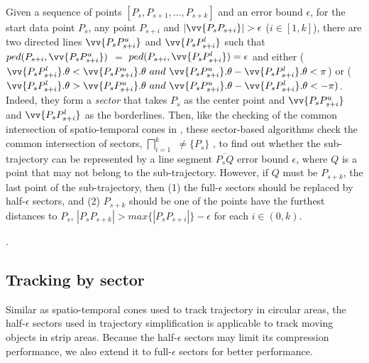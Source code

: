 Given a sequence of points $[P_{s}, P_{s+1}, \ldots, P_{s+k}]$ and an error bound $\epsilon$,
for the start data point $P_s$, any point $P_{s+i}$ and $|\vv{P_sP_{s+i}}|>\epsilon$ ($i\in[1, k]$), there are two directed lines $\vv{P_sP^u_{s+i}}$ and $\vv{P_sP^l_{s+i}}$ such that $ped(P_{s+i}, \vv{P_sP^u_{s+i}})$ $=$ $ped(P_{s+i}, \vv{P_sP^l_{s+i}}) = \epsilon$ and either ($\vv{P_sP^l_{s+i}}.\theta < \vv{P_sP^u_{s+i}}.\theta ~and~\vv{P_sP^u_{s+i}}.\theta - \vv{P_sP^l_{s+i}}.\theta <\pi$) or ($\vv{P_sP^l_{s+i}}.\theta > \vv{P_sP^u_{s+i}}.\theta ~and~ \vv{P_sP^u_{s+i}}.\theta - \vv{P_sP^l_{s+i}}.\theta < -\pi)$. Indeed, they form a \emph{sector}  that takes $P_s$ as the center point and $\vv{P_sP^u_{s+i}}$ and $\vv{P_sP^l_{s+i}}$ as the borderlines.
%
Then, like the checking of the common intersection of spatio-temporal cones in \cised, these sector-based algorithms check the common intersection of sectors, \ie $\bigsqcap_{i=1}^{k}$ $\ne \{P_s\}$ \cite{Williams:Longest, Sklansky:Cone,Zhao:Sleeve}, to find out whether the sub-trajectory can be represented by a line segment $\overline{P_sQ}$ \wrt error bound $\epsilon$, where $Q$ is a point that may not belong to the sub-trajectory. However, if $Q$ must be $P_{s+k}$, the last point of the sub-trajectory, then (1) the full-$\epsilon$ sectors should be replaced by half-$\epsilon$ sectors, and (2) $P_{s+k}$ should be one of the points have the furthest distances to $P_s$, \ie $|P_sP_{s+k}| > max\{|P_sP_{s+i}|\} - \epsilon$ for each $i \in (0, k)$. 
%


\begin{example}
	\label{exm-sleeve}
	\todo.
\end{example}

\subsection{Tracking by sector}

Similar as spatio-temporal cones used to track trajectory in circular areas, the half-$\epsilon$ sectors used in trajectory simplification is applicable to track moving objects in strip areas. 
%
Because the half-$\epsilon$ sectors may limit its compression performance, we also extend it to full-$\epsilon$ sectors for better performance.



